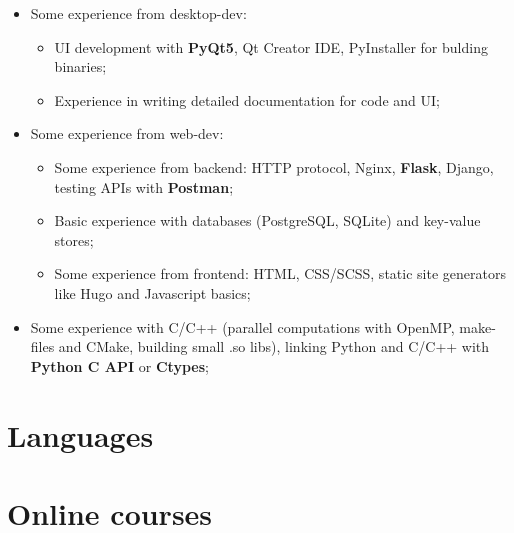 \documentclass[12pt,a4paper,roman]{moderncv}
\begin{document}
\begin{itemize}
 \item Some experience from desktop-dev:\newline
    \begin{itemize}
        \item UI development with \textbf{PyQt5}, Qt Creator IDE, PyInstaller for bulding binaries; \newline
        \item Experience in writing detailed documentation for code and UI; \newline
    \end{itemize}
 \item Some experience from web-dev: \newline
    \begin{itemize}
        \item Some experience from backend: 
          HTTP protocol, Nginx, \textbf{Flask}, Django, testing APIs with \textbf{Postman};\newline
        \item Basic experience with databases (PostgreSQL, SQLite) and key-value stores;\newline
        \item Some experience from frontend: HTML, CSS/SCSS, static site generators like Hugo and Javascript basics; \newline
    \end{itemize}
 \item Some experience with C/C++ (parallel computations with OpenMP, make-files and CMake, building small .so libs), 
 linking Python and C/C++ with \textbf{Python C API} or \textbf{Ctypes}; \newline \newline
 \end{itemize} 
\section{Languages}
\section{Online courses}
\newline\newline
{} 
\end{document}
